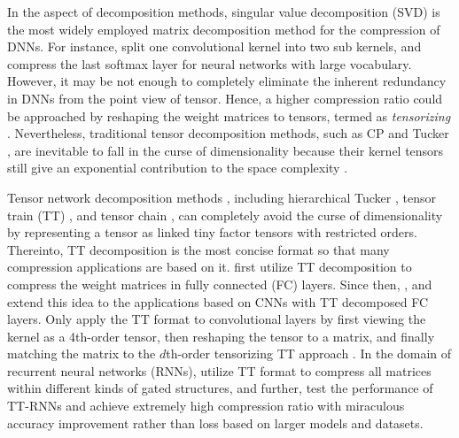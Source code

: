\documentclass[a4paper,fleqn]{cas-dc}
\begin{document}
In the aspect of decomposition methods, singular value decomposition (SVD) is the most widely employed matrix decomposition method for the compression of DNNs. For instance, \citet{Zhang_2015_SVD,Zhang_2016_SVD} split one convolutional kernel into two sub kernels, and \citet{Shim_2017_SVD} compress the last softmax layer for neural networks with large vocabulary. However, it may be not enough to completely eliminate the inherent redundancy in DNNs \citep{Denil_2013_Redundancy} from the point view  of tensor. Hence, a higher compression ratio could be approached by reshaping the weight matrices to tensors, termed as \emph{tensorizing} \citep{Novikov_2015_TT}. Nevertheless, traditional tensor decomposition methods, such as CP \citep{Caroll_1970_CP} and Tucker \citep{Tucker_1966_Tucker}, are inevitable to fall in the curse of dimensionality because their kernel tensors still give an exponential contribution to the space complexity \citep{Cichocki_2015_TensorApp}.

Tensor network decomposition methods \citep{Cichocki_2018_TensorNetworks}, including hierarchical Tucker \citep{Hackbusch_2009_InventHT,Grasedyck_2010_InventHT}, tensor train (TT) \citep{Oseledets_2011_InventTT}, and tensor chain \citep{Khoromskij_2011_InventTC,Zhao_2018_TR}, can completely avoid the curse of dimensionality   by representing a tensor as linked tiny factor tensors with restricted orders. Thereinto, TT decomposition is the most concise format so that many compression applications are based on it. \citet{Novikov_2015_TT} first utilize TT decomposition to compress the weight matrices in fully connected (FC) layers. Since then, \citet{Huang_2018_TTCNN}, \citet{Su_2018_TTCNN} and \citet{Huang_2019_TTCNN} extend this idea to the applications based on CNNs with TT decomposed FC layers. Only \citet{Garipov_2016_TTCNN} apply the TT format to convolutional layers by first viewing the kernel as a 4th-order tensor, then reshaping the tensor to a matrix, and finally matching the matrix to the \(d\)th-order tensorizing TT approach \citep{Novikov_2015_TT}. In the domain of recurrent neural networks (RNNs), \citet{Tjandra_2017_TTRNN1,Tjandra_2018_TTRNN2} utilize TT format to compress all matrices within different kinds of gated structures, and further, \citet{Yang_2017_TTRNN} test the performance of TT-RNNs and achieve extremely high compression ratio with miraculous accuracy improvement rather than loss based on larger models and datasets.
\end{document}

